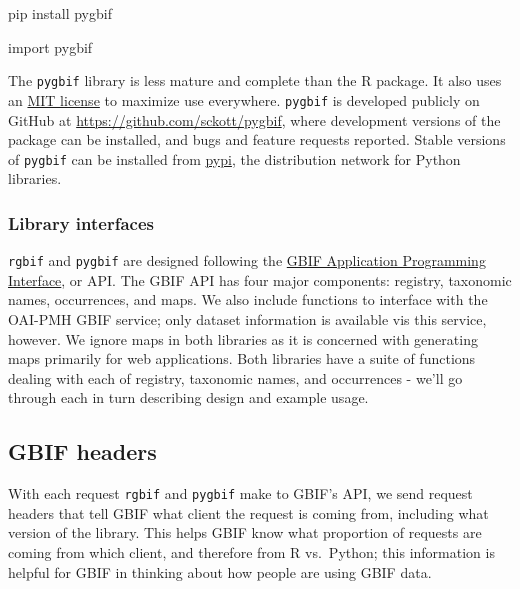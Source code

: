 \documentclass[author-year, review, 11pt]{components/elsarticle} %
\newenvironment{Shaded}{\begin{snugshade}}{\end{snugshade}}
\newcommand{\CharTok}[1]{\textcolor[rgb]{0.31,0.60,0.02}{{#1}}}
\newcommand{\NormalTok}[1]{{#1}}
\begin{document}
\begin{Shaded}
\begin{Highlighting}[]
\NormalTok{pip install pygbif}
\end{Highlighting}
\end{Shaded}

\begin{Shaded}
\begin{Highlighting}[]
\CharTok{import} \NormalTok{pygbif}
\end{Highlighting}
\end{Shaded}

The \texttt{pygbif} library is less mature and complete than the R
package. It also uses an
\href{http://choosealicense.com/licenses/mit/}{MIT license} to maximize
use everywhere. \texttt{pygbif} is developed publicly on GitHub at
\url{https://github.com/sckott/pygbif}, where development versions of
the package can be installed, and bugs and feature requests reported.
Stable versions of \texttt{pygbif} can be installed from
\href{https://pypi.python.org/pypi/pygbif}{pypi}, the distribution
network for Python libraries.

\subsubsection{Library interfaces}\label{library-interfaces}

\texttt{rgbif} and \texttt{pygbif} are designed following the
\href{http://www.gbif.org/developer/summary}{GBIF Application
Programming Interface}, or API. The GBIF API has four major components:
registry, taxonomic names, occurrences, and maps. We also include
functions to interface with the OAI-PMH GBIF service; only dataset
information is available vis this service, however. We ignore maps in
both libraries as it is concerned with generating maps primarily for web
applications. Both libraries have a suite of functions dealing with each
of registry, taxonomic names, and occurrences - we'll go through each in
turn describing design and example usage.

\subsection{GBIF headers}\label{gbif-headers}

With each request \texttt{rgbif} and \texttt{pygbif} make to GBIF's API,
we send request headers that tell GBIF what client the request is coming
from, including what version of the library. This helps GBIF know what
proportion of requests are coming from which client, and therefore from
R vs.~Python; this information is helpful for GBIF in thinking about how
people are using GBIF data.
\end{document}
